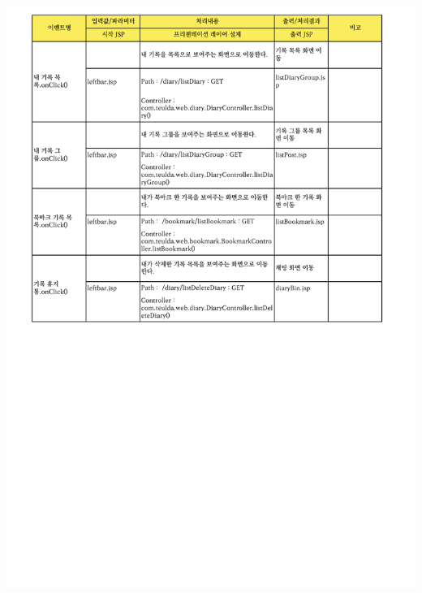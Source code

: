 {{{{{{{{{{{{{{{{{{{{{{{{{{{{{{{{{{{{{{{{{{{{\includegraphics[width=20cm]{./Figure/Design/Display/diary/diary_26.pdf} \\



}}}}}}}}}}}}}}}}}}}}}}}}}}}}}}}}}}}}}}}}}}}}
